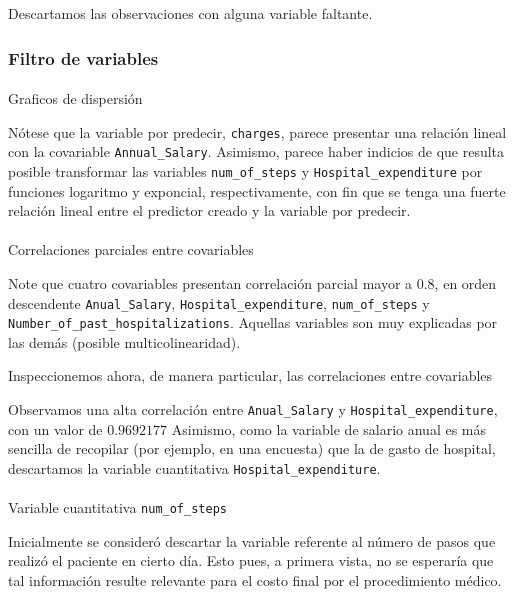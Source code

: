 \documentclass[
]{article}
\makeatletter
\let\oldparagraph\paragraph
\renewcommand{\paragraph}{
    \@ifstar
      \xxxParagraphStar
      \xxxParagraphNoStar
  }
\newcommand{\xxxParagraphStar}[1]{\oldparagraph*{#1}\mbox{}}
\newcommand{\xxxParagraphNoStar}[1]{\oldparagraph{#1}\mbox{}}
\makeatother
\begin{document}
Descartamos las observaciones con alguna variable faltante.

\subsubsection{Filtro de variables}\label{filtro-de-variables}

\paragraph{Graficos de dispersión}\label{graficos-de-dispersiuxf3n}

Nótese que la variable por predecir, \texttt{charges}, parece presentar
una relación lineal con la covariable \texttt{Annual\_Salary}. Asimismo,
parece haber indicios de que resulta posible transformar las variables
\texttt{num\_of\_steps} y \texttt{Hospital\_expenditure} por funciones
logaritmo y exponcial, respectivamente, con fin que se tenga una fuerte
relación lineal entre el predictor creado y la variable por predecir.

\paragraph{Correlaciones parciales entre
covariables}\label{correlaciones-parciales-entre-covariables}

Note que cuatro covariables presentan correlación parcial mayor a 0.8,
en orden descendente \texttt{Anual\_Salary},
\texttt{Hospital\_expenditure}, \texttt{num\_of\_steps} y
\texttt{Number\_of\_past\_hospitalizations}. Aquellas variables son muy
explicadas por las demás (posible multicolinearidad).

Inspeccionemos ahora, de manera particular, las correlaciones entre
covariables

Observamos una alta correlación entre \texttt{Anual\_Salary} y
\texttt{Hospital\_expenditure}, con un valor de \(0.9692177\) Asimismo,
como la variable de salario anual es más sencilla de recopilar (por
ejemplo, en una encuesta) que la de gasto de hospital, descartamos la
variable cuantitativa \texttt{Hospital\_expenditure}.

\paragraph{\texorpdfstring{Variable cuantitativa
\texttt{num\_of\_steps}}{Variable cuantitativa num\_of\_steps}}\label{variable-cuantitativa-num_of_steps}

Inicialmente se consideró descartar la variable referente al número de
pasos que realizó el paciente en cierto día. Esto pues, a primera vista,
no se esperaría que tal información resulte relevante para el costo
final por el procedimiento médico.
\end{document}
